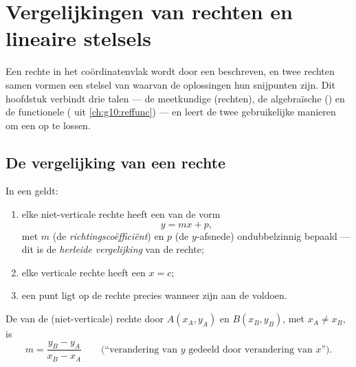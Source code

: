 \chapter{Vergelijkingen van rechten en lineaire stelsels}\label{ch:g10:lines}

Een rechte in het coördinatenvlak wordt door een  beschreven, en
twee rechten samen vormen een stelsel van  waarvan de
oplossingen hun snijpunten zijn. Dit hoofdstuk verbindt drie talen ---
de meetkundige (rechten), de algebraïsche () en de functionele
( uit \cref{ch:g10:reffunc}) --- en leert de twee gebruikelijke
manieren om een  op te lossen.

\section{De vergelijking van een rechte}

\begin{theorem}\label{thm:g10:lines:reduced}
In een  geldt:
\begin{enumerate}
  \item elke niet-verticale rechte heeft een  van de vorm
        \[
        y = mx + p ,
        \]
        met $m$ (de \emph{richtingscoëfficiënt})
        en $p$ (de $y$-afsnede) ondubbelzinnig bepaald --- dit is de
        \emph{herleide vergelijking} van de
        rechte;
  \item elke verticale rechte heeft een  $x = c$;
  \item een punt ligt op de rechte precies wanneer zijn  aan de
         voldoen.
\end{enumerate}
\end{theorem}
\admitted

\begin{proposition}\label{prop:g10:lines:slope}
De  van de (niet-verticale) rechte door $A(x_A, y_A)$ en
$B(x_B, y_B)$, met $x_A \neq x_B$, is
\[
m = \frac{y_B - y_A}{x_B - x_A}
\qquad
\text{(``verandering van $y$ gedeeld door verandering van $x$'').}
\]
\end{proposition}


